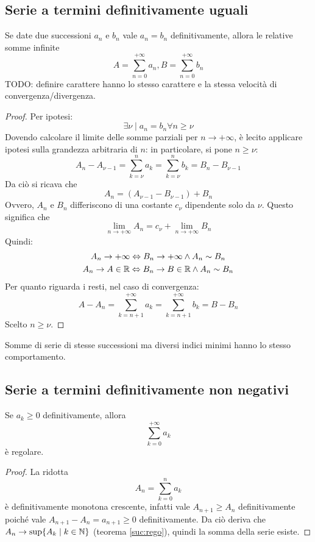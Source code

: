 \subsection{Serie a termini definitivamente uguali}
\begin{teor}
	\label{ser:defugu}
	Se date due successioni $a_n$ e $b_n$ vale $a_n=b_n$ definitivamente, allora le relative somme infinite
	\[
		A=\sum_{n=0}^{+\infty} a_n, B=\sum_{n=0}^{+\infty} b_n
	\]
	TODO: definire carattere
	hanno lo stesso carattere e la stessa velocità di convergenza/divergenza.
\end{teor}
\begin{proof}
	Per ipotesi:
	\[
		\exists\nu\mid a_n=b_n\forall n\geq\nu
	\]
	Dovendo calcolare il limite delle somme parziali per $n\to+\infty$, è lecito applicare ipotesi sulla grandezza arbitraria di $n$: in particolare, si pone $n\geq\nu$:
	\[
		A_n-A_{\nu-1}=\sum_{k=\nu}^n a_k=\sum_{k=\nu}^n b_k=B_n-B_{\nu-1}
	\]
	Da ciò si ricava che
	\[
		A_n=(A_{\nu-1}-B_{\nu-1})+B_n
	\]
	Ovvero, $A_n$ e $B_n$ differiscono di una costante $c_\nu$ dipendente solo da $\nu$. Questo significa che
	\[
		\lim_{n\to+\infty} A_n=c_\nu+\lim_{n\to+\infty} B_n
	\]
	Quindi:
	\begin{gather}
		A_n\to+\infty\Leftrightarrow B_n\to+\infty\land A_n\sim B_n\\
		A_n\to A\in\mathbb{R}\Leftrightarrow B_n\to B\in\mathbb{R}\land A_n\sim B_n
	\end{gather}
	Per quanto riguarda i resti, nel caso di convergenza:
	\[
		A-A_n=\sum_{k=n+1}^{+\infty} a_k=\sum_{k=n+1}^{+\infty} b_k=B-B_n
	\]
	Scelto $n\geq\nu$.
\end{proof}

\begin{corol}
	Somme di serie di stesse successioni ma diversi indici minimi hanno lo stesso comportamento.
\end{corol}

\subsection{Serie a termini definitivamente non negativi}
\begin{teor}
	\label{ser:defpos}
	Se $a_k\geq0$ definitivamente, allora
	\[
		\sum_{k=0}^{+\infty} a_k
	\]
	è regolare.
\end{teor}
\begin{proof}
	La ridotta
	\[
		A_n=\sum_{k=0}^n a_k
	\]
	è definitivamente monotona crescente, infatti vale $A_{n+1}\geq A_n$ definitivamente poiché vale $A_{n+1}-A_n=a_{n+1}\geq 0$ definitivamente. Da ciò deriva che $A_n\to\text{sup}\{A_k\mid k\in\mathbb{N}\}$ (teorema \vref{suc:rego}), quindi la somma della serie esiste.
\end{proof}

